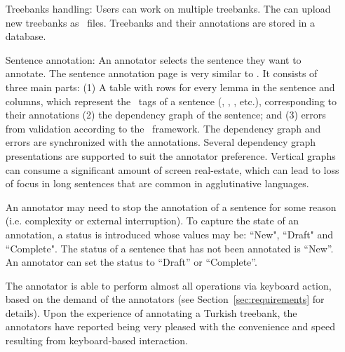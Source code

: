\begin{itemize}[before=\normalfont, font=\itshape, align=left,noitemsep,topsep=0pt,parsep=0pt,partopsep=0pt,labelwidth=5cm,align=left,itemindent=5cm]
    \item[Treebanks handling:]
        Users can work on multiple treebanks.
        The can upload new treebanks as \conllu\ files.
        Treebanks and their annotations are stored in a database.

    \item[Sentence annotation:]
    	An annotator selects the sentence they want to annotate. 
        The sentence annotation page is very similar to \boatvone.
        It consists of three main parts: (1) A table with rows for every lemma in the sentence and columns, which represent the \ud\ tags of a sentence (\form, \lemma, \deprel, etc.), corresponding to their annotations (2) the dependency graph of the sentence; and (3) errors from validation according to the \ud\ framework.
        The dependency graph and errors are synchronized with the annotations.
        Several dependency graph presentations are supported to suit the annotator preference.
        Vertical graphs can consume a significant amount of screen real-estate, which can lead to loss of focus in long sentences that are common in agglutinative languages.

        An annotator may need to stop the annotation of a sentence for some reason (i.e. complexity or external interruption).
        To capture the state of an annotation, a status is introduced whose values may be: ``New", ``Draft" and ``Complete". 
        The status of a sentence that has not been annotated is ``New''. 
	An annotator can set the status to ``Draft'' or ``Complete''. 

        The annotator is able to perform almost all operations via keyboard action, based on the demand of the annotators (see Section~\ref{sec:requirements} for details).
        Upon the experience of annotating a Turkish treebank, the annotators have reported being very pleased with the convenience and speed resulting from keyboard-based interaction.


\end{itemize}

